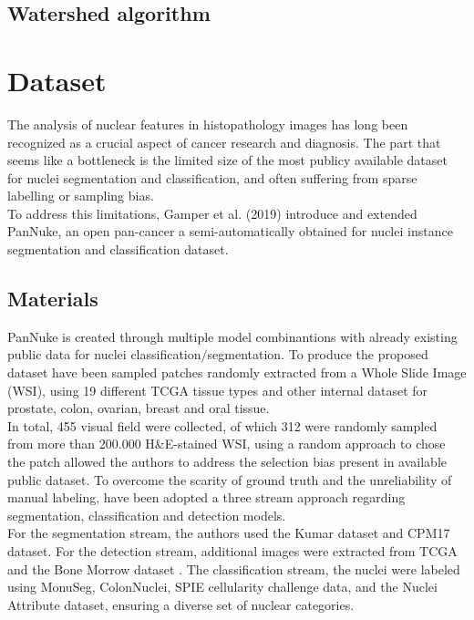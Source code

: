 \documentclass[target=bach,aauheader=,style=]{thud}
\begin{document}
\section{Watershed algorithm}
\chapter{Dataset}
\label{sec:dataset}
The analysis of nuclear features in histopathology images has long been recognized as a crucial aspect of cancer research and diagnosis. The part that seems like a bottleneck is the limited size of the most publicy available dataset for nuclei segmentation and classification, and often suffering from sparse labelling or sampling bias.\\
To address this limitations, Gamper et al. (2019) 
\cite{gamper2019pannuke,gamper2020pannuke} introduce and extended PanNuke, an open pan-cancer a semi-automatically obtained for nuclei instance segmentation and classification dataset.

\section{Materials}
PanNuke is created through multiple model combinantions with already existing public data for nuclei classification$/$segmentation. To produce the proposed dataset have been sampled patches randomly extracted from a Whole Slide Image (WSI), using 19 different TCGA tissue types and other internal dataset for prostate, colon, ovarian, breast and oral tissue.\\
In total, 455 visual field were collected, of which 312 were randomly sampled from more than 200.000 H\&E-stained WSI, using a random approach to chose the patch allowed the authors to address the selection bias present in available public dataset. To overcome the scarity of ground truth and the unreliability of manual labeling, have been adopted a three stream approach regarding segmentation, classification and detection models.\\
For the segmentation stream, the authors used the Kumar \cite{article} dataset and CPM17 \cite{vu2018methodssegmentationclassificationdigital} dataset. For the detection stream, additional images were extracted from TCGA and the Bone Morrow \cite{10.1007/978-3-319-24574-4_33} dataset  . The classification stream, the nuclei were labeled using MonuSeg, ColonNuclei, SPIE cellularity challenge data, and the Nuclei Attribute dataset, ensuring a diverse set of nuclear categories.\\
\end{document}
